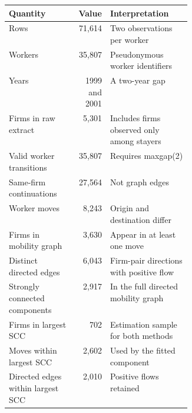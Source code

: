 \begin{tabularx}{\linewidth}{@{}L{0.36\linewidth}rX@{}}
\toprule
Quantity & Value & Interpretation \\
\midrule
Rows & 71,614 & Two observations per worker \\
Workers & 35,807 & Pseudonymous worker identifiers \\
Years & 1999 and 2001 & A two-year gap \\
Firms in raw extract & 5,301 & Includes firms observed only among stayers \\
Valid worker transitions & 35,807 & Requires maxgap(2) \\
Same-firm continuations & 27,564 & Not graph edges \\
Worker moves & 8,243 & Origin and destination differ \\
Firms in mobility graph & 3,630 & Appear in at least one move \\
Distinct directed edges & 6,043 & Firm-pair directions with positive flow \\
Strongly connected components & 2,917 & In the full directed mobility graph \\
Firms in largest SCC & 702 & Estimation sample for both methods \\
Moves within largest SCC & 2,602 & Used by the fitted component \\
Directed edges within largest SCC & 2,010 & Positive flows retained \\
\bottomrule
\end{tabularx}
